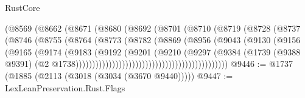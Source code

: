 \begin{lexlean}{RustCore}
\begin{coremodule}
                                    (@8569
                                      (@8662
                                        (@8671
                                          (@8680
                                            (@8692
                                              (@8701
                                                (@8710
                                                  (@8719
                                                    (@8728
                                                      (@8737
                                                        (@8746
                                                          (@8755
                                                            (@8764
                                                              (@8773
                                                                (@8782
                                                                  (@8869
                                                                    (@8956
                                                                      (@9043
                                                                        (@9130
                                                                          (@9156
                                                                            (@9165
                                                                              (@9174
                                                                                (@9183
                                                                                  (@9192
                                                                                    (@9201
                                                                                      (@9210
                                                                                        (@9297
                                                                                          (@9384
                                                                                            (@1739
                                                                                              (@9388
                                                                                                @9391)
                                                                                              (@2
                                                                                                @1738))))))))))))))))))))))))))))))))))))))))))))))
@9446 := @1737 (@1885 (@2113 (@3018 (@3034 (@3670 @9440)))))
@9447 := LexLeanPreservation.Rust.Flags

\end{coremodule}
\end{lexlean}
